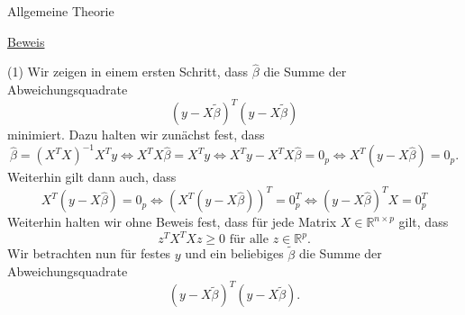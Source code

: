 \documentclass[
  8pt,
  ignorenonframetext,
]{beamer}
\begin{document}
\begin{frame}{Allgemeine Theorie}
\protect\hypertarget{allgemeine-theorie-1}{}
\footnotesize

\underline{Beweis}

\noindent (1) Wir zeigen in einem ersten Schritt, dass \(\hat{\beta}\)
die Summe der Abweichungsquadrate \begin{equation}
(y - X\tilde{\beta})^T(y - X\tilde{\beta})
\end{equation} minimiert. Dazu halten wir zunächst fest, dass
\begin{equation}
\hat{\beta} = (X^TX)^{-1}X^Ty 
\Leftrightarrow 
X^TX\hat{\beta} = X^Ty
\Leftrightarrow 
X^Ty - X^TX\hat{\beta} = 0_p
\Leftrightarrow 
X^T(y -  X\hat{\beta}) = 0_p.
\end{equation} Weiterhin gilt dann auch, dass \begin{equation}
X^T(y - X\hat{\beta}) = 0_p
\Leftrightarrow
\left(X^T(y - X\hat{\beta})\right)^T = 0_p^T
\Leftrightarrow
(y - X\hat{\beta})^TX = 0_p^T
\end{equation} Weiterhin halten wir ohne Beweis fest, dass für jede
Matrix \(X \in \mathbb{R}^{n \times p}\) gilt, dass \begin{equation}
z^TX^TXz \ge 0 \mbox{ für alle } z \in \mathbb{R}^p.
\end{equation} Wir betrachten nun für festes \(y\) und ein beliebiges
\(\tilde{\beta}\) die Summe der Abweichungsquadrate \begin{equation}
(y - X\tilde{\beta})^T(y - X\tilde{\beta}).
\end{equation}
\end{frame}
\end{document}
